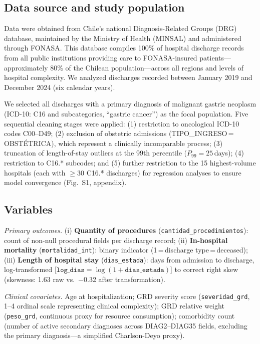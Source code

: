 \documentclass[10pt,twocolumn]{article}
\begin{document}
\subsection{Data source and study population}

Data were obtained from Chile's national Diagnosis-Related Groups (DRG) database,
maintained by the Ministry of Health (MINSAL) and administered through FONASA.
This database compiles 100\% of hospital discharge records from all public institutions
providing care to FONASA-insured patients—approximately 80\% of the Chilean
population—across all regions and levels of hospital complexity. We analyzed discharges
recorded between January 2019 and December 2024 (six calendar years).

We selected all discharges with a primary diagnosis of malignant gastric neoplasm
(ICD-10: C16 and subcategories, ``gastric cancer'') as the focal population. Five
sequential cleaning stages were applied: (1) restriction to oncological ICD-10 codes
C00–D49; (2) exclusion of obstetric admissions (TIPO\_INGRESO\,=\,OBSTÉTRICA),
which represent a clinically incomparable process; (3) truncation of length-of-stay
outliers at the 99th percentile ($P_{99} = 25$\,days); (4) restriction to C16.*
subcodes; and (5) further restriction to the 15 highest-volume hospitals (each with
$\geq 30$ C16.* discharges) for regression analyses to ensure model convergence
(Fig.~S1, appendix).

\subsection{Variables}

\textit{Primary outcomes.} (i) \textbf{Quantity of procedures} (\texttt{cantidad\_pro\-ce\-di\-mien\-tos}): count of non-null procedural fields per discharge record;
(ii) \textbf{In-hospital mortality} (\texttt{mortalidad\_int}): binary indicator
(1\,=\,discharge type\,=\,deceased); (iii) \textbf{Length of hospital stay}
(\texttt{dias\_estada}): days from admission to discharge, log-transformed
[$\texttt{log\_dias} = \log(1 + \texttt{dias\_estada})$] to correct right skew
(skewness: 1.63 raw vs.\ $-$0.32 after transformation).

\textit{Clinical covariates.} Age at hospitalization; GRD severity score
(\texttt{se\-ve\-ri\-dad\_grd}, 1–4 ordinal scale representing clinical complexity);
GRD relative weight (\texttt{pe\-so\_grd}, continuous proxy for resource consumption);
comorbidity count (number of active secondary diagnoses across DIAG2–DIAG35 fields,
excluding the primary diagnosis—a simplified Charlson-Deyo proxy).
\end{document}
